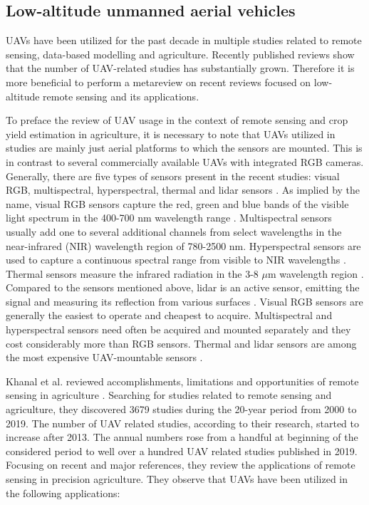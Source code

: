 \subsection{Low-altitude unmanned aerial vehicles}
\label{subsec:data-uavs-review}

UAVs have been utilized for the past decade in multiple studies related to remote sensing, data-based modelling and agriculture. Recently published reviews show that the number of UAV-related studies has substantially grown. Therefore it is more beneficial to perform a metareview on recent reviews focused on low-altitude remote sensing and its applications.

To preface the review of UAV usage in the context of remote sensing and crop yield estimation in agriculture, it is necessary to note that UAVs utilized in studies are mainly just aerial platforms to which the sensors are mounted. This is in contrast to several commercially available UAVs with integrated RGB cameras. Generally, there are five types of sensors present in the recent studies: visual RGB, multispectral, hyperspectral, thermal and lidar sensors \cite{Tsouros2019,Xie2020,Messina2020}. As implied by the name, visual RGB sensors capture the red, green and blue bands of the visible light spectrum in the 400-700 nm wavelength range \cite{Xie2020}. Multispectral sensors usually add one to several additional channels from select wavelengths in the near-infrared (NIR) wavelength region of 780-2500 nm. Hyperspectral sensors are used to capture a continuous spectral range from visible to NIR wavelengths \cite{Xie2020}. Thermal sensors measure the infrared radiation in the 3-8 $\mu$m wavelength region \cite{Messina2020}. Compared to the sensors mentioned above, lidar is an active sensor, emitting the signal and measuring its reflection from various surfaces \cite{Xie2020,Khanal2020}. Visual RGB sensors are generally the easiest to operate and cheapest to acquire. Multispectral and hyperspectral sensors need often be acquired and mounted separately and they cost considerably more than RGB sensors. Thermal and lidar sensors are among the most expensive UAV-mountable sensors \cite{Tsouros2019}.

Khanal et al. reviewed accomplishments, limitations and opportunities of remote sensing in agriculture \cite{Khanal2020}. Searching for studies related to remote sensing and agriculture, they discovered 3679 studies during the 20-year period from 2000 to 2019. The number of UAV related studies, according to their research, started to increase after 2013. The annual numbers rose from a handful at beginning of the considered period to well over a hundred UAV related studies published in 2019. Focusing on recent and major references, they review the applications of remote sensing in precision agriculture. They observe that UAVs have been utilized in the following applications:

